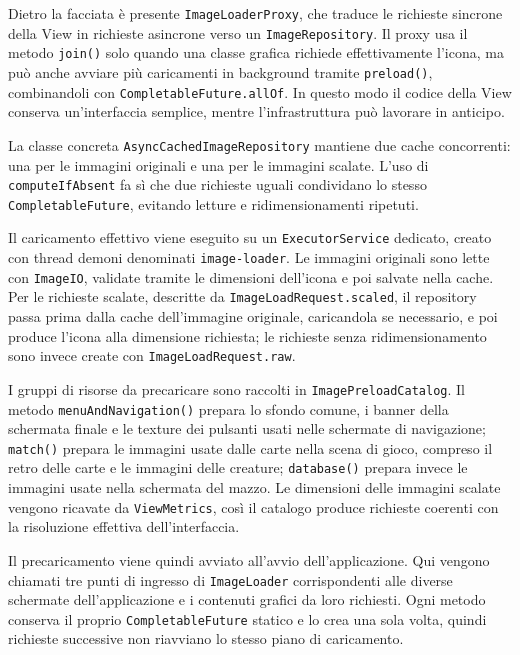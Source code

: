 Dietro la facciata è presente \texttt{ImageLoaderProxy}, che traduce le
richieste sincrone della View in richieste asincrone verso un
\texttt{ImageRepository}. Il proxy usa il metodo \texttt{join()} solo quando una
classe grafica richiede effettivamente l'icona, ma può anche avviare più
caricamenti in background tramite \texttt{preload()}, combinandoli con
\texttt{Completable\-Future.allOf}. In questo modo il codice della View conserva
un'interfaccia semplice, mentre l'infrastruttura può lavorare in anticipo.

La classe concreta \texttt{AsyncCachedImageRepository} mantiene due cache
concorrenti: una per le immagini originali e una per le immagini scalate.
L'uso di \texttt{computeIfAbsent} fa sì che due richieste uguali condividano lo
stesso \texttt{CompletableFuture}, evitando letture e ridimensionamenti
ripetuti.

Il caricamento effettivo viene eseguito su un \texttt{ExecutorService} dedicato,
creato con thread demoni denominati \texttt{image-loader}. Le immagini originali
sono lette con \texttt{ImageIO}, validate tramite le dimensioni dell'icona e poi
salvate nella cache. Per le richieste scalate, descritte da
\texttt{ImageLoadRequest.scaled}, il repository passa prima dalla cache
dell'immagine originale, caricandola se necessario, e poi produce l'icona alla
dimensione richiesta; le richieste senza ridimensionamento sono invece create con
\texttt{ImageLoadRequest.raw}.

I gruppi di risorse da precaricare sono raccolti in
\texttt{ImagePreloadCatalog}. Il metodo \texttt{menuAndNavigation()}
prepara lo sfondo comune, i banner della schermata finale e le texture dei
pulsanti usati nelle schermate di navigazione; \texttt{match()} prepara le
immagini usate dalle carte nella scena di gioco, compreso il retro delle carte e
le immagini delle creature; \texttt{database()} prepara invece le immagini usate
nella schermata del mazzo. Le dimensioni delle immagini scalate vengono ricavate
da \texttt{ViewMetrics}, così il catalogo produce richieste coerenti con la
risoluzione effettiva dell'interfaccia.

Il precaricamento viene quindi avviato all'avvio dell'applicazione. Qui vengono
chiamati tre punti di ingresso di \texttt{ImageLoader} corrispondenti alle diverse schermate
dell'applicazione e i contenuti grafici da loro richiesti. Ogni metodo
conserva il proprio \texttt{CompletableFuture} statico e lo crea una sola
volta, quindi richieste successive non riavviano lo stesso piano di
caricamento.

